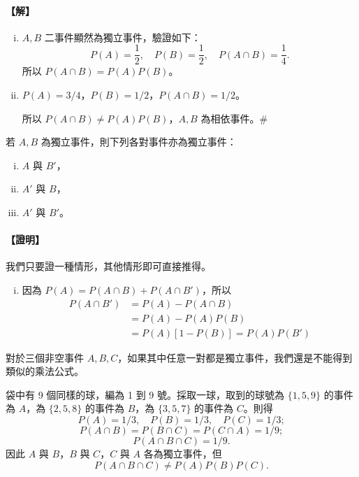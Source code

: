 \paragraph{【解】}
\begin{enumerate}[(i), leftmargin=2.5em, itemsep=0.3em]
  \item $A, B$ 二事件顯然為獨立事件，驗證如下：
  \[
  P(A) = \frac{1}{2}, \quad P(B) = \frac{1}{2}, \quad P(A \cap B) = \frac{1}{4}.
  \]
  所以 $P(A \cap B) = P(A)P(B)$。
  \item $P(A) = 3/4$，$P(B) = 1/2$，$P(A \cap B) = 1/2$。
  
  所以 $P(A \cap B) \neq P(A)P(B)$，$A, B$ 為相依事件。\hfill\#
\end{enumerate}

\medskip
\begin{theorem}\label{thm:b5-4-7}
若 $A, B$ 為獨立事件，則下列各對事件亦為獨立事件：
\begin{enumerate}[(i), leftmargin=2.5em, itemsep=0.2em]
  \item $A$ 與 $B'$，
  \item $A'$ 與 $B$，
  \item $A'$ 與 $B'$。
\end{enumerate}
\end{theorem}
\paragraph{【證明】}
我們只要證一種情形，其他情形即可直接推得。
\begin{enumerate}[(i), leftmargin=2.5em, itemsep=0.3em]
  \item 因為 $P(A) = P(A \cap B) + P(A \cap B')$，所以
  \begin{align*}
  P(A \cap B') &= P(A) - P(A \cap B) \\
  &= P(A) - P(A)P(B) \\
  &= P(A)[1 - P(B)] = P(A)P(B') \tag*{\#}
  \end{align*}
\end{enumerate}

對於三個非空事件 $A, B, C$，如果其中任意一對都是獨立事件，我們還是不能得到類似的乘法公式。

\medskip
\begin{discussion}\label{disc:b5-4-6}
袋中有 9 個同樣的球，編為 1 到 9 號。採取一球，取到的球號為 $\{1, 5, 9\}$ 的事件為 $A$，為 $\{2, 5, 8\}$ 的事件為 $B$，為 $\{3, 5, 7\}$ 的事件為 $C$。則得
\[
P(A) = 1/3, \quad P(B) = 1/3, \quad P(C) = 1/3;
\]
\[
P(A \cap B) = P(B \cap C) = P(C \cap A) = 1/9;
\]
\[
P(A \cap B \cap C) = 1/9.
\]
因此 $A$ 與 $B$，$B$ 與 $C$，$C$ 與 $A$ 各為獨立事件，但
\[
P(A \cap B \cap C) \neq P(A)P(B)P(C).
\]
\end{discussion}

